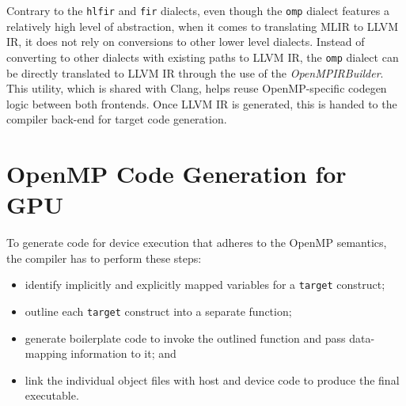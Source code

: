\documentclass[acmtog,natbib=false]{acmart}
\newcommand{\code}[1]{\texttt{#1}\xspace}
\begin{document}
Contrary to the \code{hlfir} and \code{fir} dialects, even though the \code{omp} dialect features a relatively high level of abstraction, when it comes to translating \ac{MLIR} to LLVM \ac{IR}, it does not rely on conversions to other lower level dialects.
Instead of converting to other dialects with existing paths to LLVM \ac{IR}, the \code{omp} dialect can be directly translated to LLVM \ac{IR} through the use of the \textit{OpenMPIRBuilder}.
This utility, which is shared with Clang, helps reuse OpenMP-specific codegen logic between both frontends.
Once LLVM \ac{IR} is generated, this is handed to the compiler back-end for target code generation.



\section{OpenMP Code Generation for GPU}
\label{sec:OpenMPCodeGen}

To generate code for device execution that adheres to the OpenMP semantics, the compiler has to perform these steps:

\begin{itemize}
\item identify implicitly and explicitly mapped variables for a \code{target} construct;
\item outline each \code{target} construct into a separate function;
\item generate boilerplate code to invoke the outlined function and pass data-mapping information to it; and
\item link the individual object files with host and device code to produce the final executable.
\end{itemize}
\end{document}
